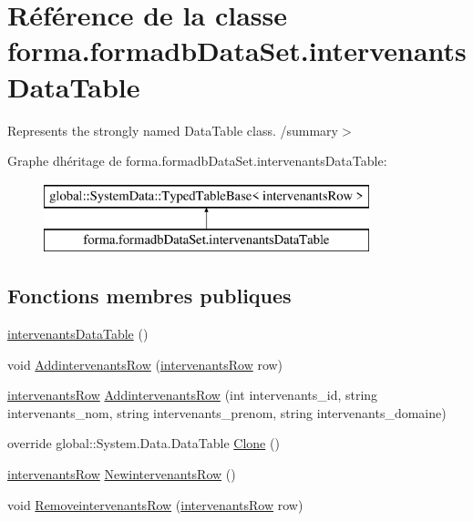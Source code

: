 \hypertarget{classforma_1_1formadb_data_set_1_1intervenants_data_table}{}\section{Référence de la classe forma.\+formadb\+Data\+Set.\+intervenants\+Data\+Table}
\label{classforma_1_1formadb_data_set_1_1intervenants_data_table}


Represents the strongly named Data\+Table class. /summary$>$  


Graphe d\textquotesingle{}héritage de forma.\+formadb\+Data\+Set.\+intervenants\+Data\+Table\+:\begin{figure}[H]
\begin{center}
\leavevmode
\includegraphics[height=2.000000cm]{classforma_1_1formadb_data_set_1_1intervenants_data_table}
\end{center}
\end{figure}
\subsection*{Fonctions membres publiques}
\begin{DoxyCompactItemize}
\item 
\hyperlink{classforma_1_1formadb_data_set_1_1intervenants_data_table_a7fca2b4ed114e06eb6f2ca76bb1f5d6c}{intervenants\+Data\+Table} ()
\item 
void \hyperlink{classforma_1_1formadb_data_set_1_1intervenants_data_table_ad1ea2600252c4bc36243e72f3a755cb4}{Addintervenants\+Row} (\hyperlink{classforma_1_1formadb_data_set_1_1intervenants_row}{intervenants\+Row} row)
\item 
\hyperlink{classforma_1_1formadb_data_set_1_1intervenants_row}{intervenants\+Row} \hyperlink{classforma_1_1formadb_data_set_1_1intervenants_data_table_a43fd2c94b01cf74c4ac952c8abdace5d}{Addintervenants\+Row} (int intervenants\+\_\+id, string intervenants\+\_\+nom, string intervenants\+\_\+prenom, string intervenants\+\_\+domaine)
\item 
override global\+::\+System.\+Data.\+Data\+Table \hyperlink{classforma_1_1formadb_data_set_1_1intervenants_data_table_a09a1650afd78b533a4c21ac648203d20}{Clone} ()
\item 
\hyperlink{classforma_1_1formadb_data_set_1_1intervenants_row}{intervenants\+Row} \hyperlink{classforma_1_1formadb_data_set_1_1intervenants_data_table_aaafd62ef7861f92e8a4547c6ec85fcd2}{Newintervenants\+Row} ()
\item 
void \hyperlink{classforma_1_1formadb_data_set_1_1intervenants_data_table_a0bd1b66562e9e86019c3ac9195d3d22e}{Removeintervenants\+Row} (\hyperlink{classforma_1_1formadb_data_set_1_1intervenants_row}{intervenants\+Row} row)
\end{DoxyCompactItemize}
